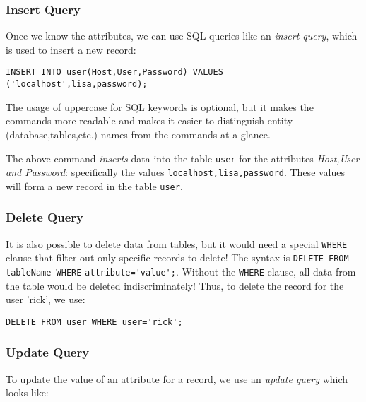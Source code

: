 \subsubsection{Insert Query}
\vspace{-10pt}
Once we know the attributes, we can use SQL queries like an \textit{insert query}, which is used to insert a new record:

\vspace{-15pt}
\begin{verbatim}
INSERT INTO user(Host,User,Password) VALUES ('localhost',lisa,password);
\end{verbatim}
\vspace{-10pt}	

\noindent
The usage of uppercase for SQL keywords is optional, but it makes the commands more readable and makes it easier to distinguish entity (database,tables,etc.) names from the commands at a glance. 

The above command \textit{inserts} data into the table \verb|user| for the attributes \textit{Host,User and Password}: specifically the values \verb|localhost,lisa,password|. These values will form a new record in the table \verb|user|. 

\subsubsection{Delete Query}
\vspace{-10pt}
It is also possible to delete data from tables, but it would need a special \verb|WHERE| clause that filter out only specific records to delete! The syntax is \verb|DELETE FROM tableName WHERE| \verb|attribute='value';|. Without the \verb|WHERE| clause, all data from the table would be deleted indiscriminately! Thus, to delete the record for the user 'rick', we use:

\vspace{-15pt}
\begin{verbatim}
DELETE FROM user WHERE user='rick';
\end{verbatim}
\vspace{-10pt}	

\subsubsection{Update Query}
\vspace{-10pt}
To update the value of an attribute for a record, we use an \textit{update query} which looks like:

